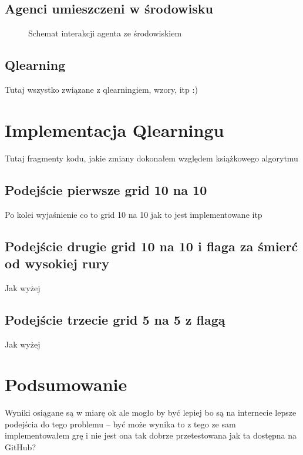 \documentclass[a4paper,12pt,oneside]{book}
\begin{document}
\section{Agenci umieszczeni w środowisku}
\begin{figure}[!htb]
\begin{center}
\end{center}
\label{rl_figure}
\caption{Schemat interakcji agenta ze środowiskiem}
\end{figure}
\label{Schemat agenta w środowisku}
\section{Q\dywiz learning}
Tutaj wszystko związane z qlearningiem, wzory, itp :)

\chapter{Implementacja Q\dywiz learningu}
\label{chapter:implementacja_qlearningu}
Tutaj fragmenty kodu, jakie zmiany dokonałem względem książkowego algorytmu
\section{Podejście pierwsze grid 10 na 10}
Po kolei wyjaśnienie co to grid 10 na 10 jak to jest implementowane itp
\section{Podejście drugie grid 10 na 10 i flaga za śmierć od wysokiej rury}
Jak wyżej
\section{Podejście trzecie grid 5 na 5 z flagą}
Jak wyżej

\chapter{Podsumowanie}
Wyniki osiągane są w miarę ok ale mogło by być lepiej bo są na internecie lepsze
podejścia do tego problemu -- być może wynika to z tego ze sam implementowałem grę
i nie jest ona tak dobrze przetestowana jak ta dostępna na GitHub?
\end{document}
